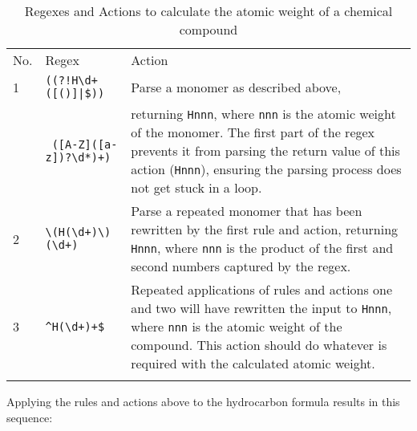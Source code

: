 \begin{table}[ht]
    \caption{Regexes and Actions to calculate the atomic weight of a
    chemical compound}
    \empty{}\label{Regexes and Actions to calculate the atomic weight of a
    chemical compound}
    \begin{tabular}{llp{\chemicalactionwidth}}

        \tabletopline{}%
        No.   & Regex                       & Action \\
        \tablemiddleline{}%
        1     & \verb'((?!H\d+([()]|$))'    & Parse a monomer as described above,  \\
              & \verb' ([A-Z]([a-z])?\d*)+)'& returning \verb!Hnnn!, where \verb!nnn! is
                                              the atomic weight of the monomer.  The first
                                              part of the regex prevents it from parsing
                                              the return value of this action
                                              (\verb!Hnnn!), ensuring the parsing process
                                              does not get stuck in a loop.  \\
        2     & \verb!\(H(\d+)\)(\d+)!      & Parse a repeated monomer that has been
                                              rewritten by the first rule and action,
                                              returning \verb!Hnnn!, where \verb!nnn! is
                                              the product of the first and second numbers
                                              captured by the regex.  \\
        3     & \verb!^H(\d+)+$!            & Repeated applications of rules and
                                              actions one and two will have rewritten the
                                              input to \verb!Hnnn!, where \verb!nnn! is
                                              the atomic weight of the compound.  This
                                              action should do whatever is required with
                                              the calculated atomic weight.  \\
        \tablebottomline{}%

    \end{tabular}
\end{table}

Applying the rules and actions above to the hydrocarbon formula results in
this sequence:

